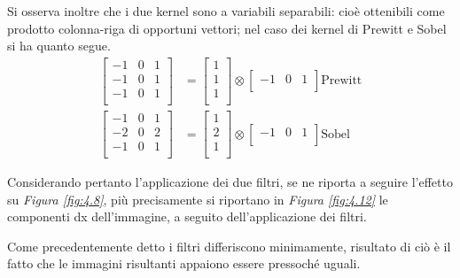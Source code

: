 \documentclass{subfiles}
\begin{document}
Si osserva inoltre che i due kernel sono a variabili separabili: cioè ottenibili come prodotto colonna-riga di opportuni vettori;
nel caso dei kernel di Prewitt e Sobel si ha quanto segue.
\[\begin{aligned}
        \begin{bmatrix}
            -1 & 0 & 1 \\
            -1 & 0 & 1 \\
            -1 & 0 & 1 \\
        \end{bmatrix} & = \begin{bmatrix}
                              1 \\
                              1 \\
                              1 \\
                          \end{bmatrix} \otimes \begin{bmatrix}
                                                    -1 & 0 & 1 \\
                                                \end{bmatrix} \text{Prewitt} \\
        \begin{bmatrix}
            -1 & 0 & 1 \\
            -2 & 0 & 2 \\
            -1 & 0 & 1 \\
        \end{bmatrix} & = \begin{bmatrix}
                              1 \\
                              2 \\
                              1 \\
                          \end{bmatrix} \otimes \begin{bmatrix}
                                                    -1 & 0 & 1 \\
                                                \end{bmatrix} \text{Sobel}
    \end{aligned}
\]

Considerando pertanto l'applicazione dei due filtri, se ne riporta a seguire l'effetto su \emph{Figura \ref{fig:4.8}},
più precisamente si riportano in \emph{Figura \ref{fig:4.12}} le componenti dx dell'immagine, a seguito dell'applicazione dei filtri.


Come precedentemente detto i filtri differiscono minimamente, risultato di ciò è il fatto che le immagini risultanti appaiono essere pressoché uguali.
\end{document}
